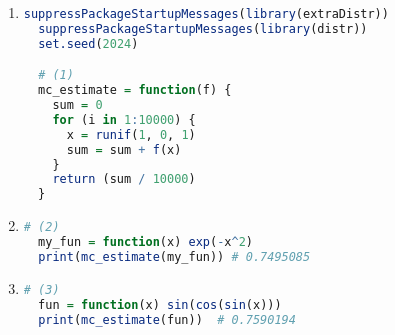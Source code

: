 \documentclass{article}
\begin{document}



\begin{enumerate}
\item 
\begin{lstlisting}[language=R]
  suppressPackageStartupMessages(library(extraDistr))
  suppressPackageStartupMessages(library(distr))
  set.seed(2024)

  # (1)
  mc_estimate = function(f) {
    sum = 0
    for (i in 1:10000) {
      x = runif(1, 0, 1)
      sum = sum + f(x)
    }
    return (sum / 10000)
  }
\end{lstlisting}


\item 
\begin{lstlisting}[language=R]
  # (2)
  my_fun = function(x) exp(-x^2)
  print(mc_estimate(my_fun)) # 0.7495085
\end{lstlisting}

\item 
\begin{lstlisting}[language=R]
  # (3)
  fun = function(x) sin(cos(sin(x)))
  print(mc_estimate(fun))  # 0.7590194
  
\end{lstlisting}
\end{enumerate}
\end{document}
